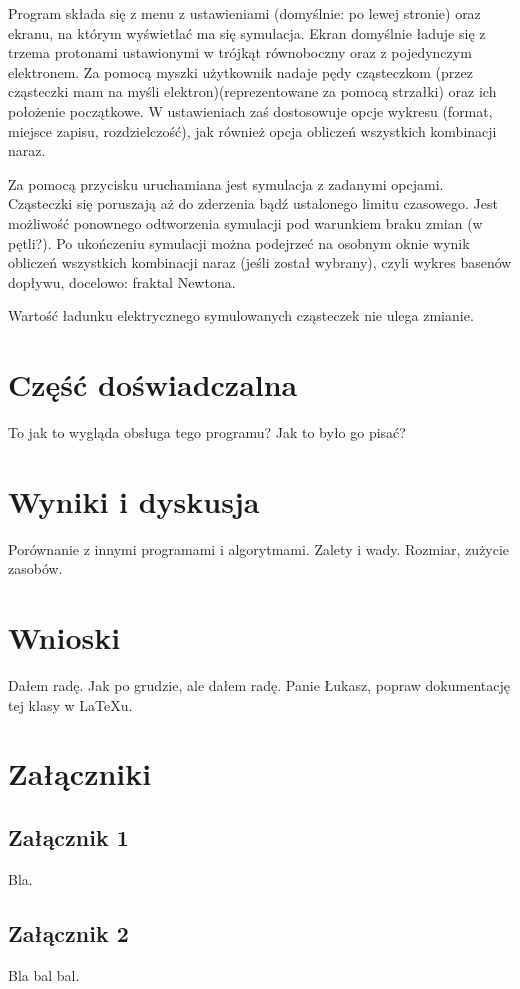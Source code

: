 \documentclass{SGGW-thesis}
\begin{document}
Program składa się z menu z ustawieniami (domyślnie: po lewej stronie) oraz ekranu, na którym wyświetlać ma się symulacja. Ekran domyślnie ładuje się z trzema protonami ustawionymi w trójkąt równoboczny oraz z pojedynczym elektronem. Za pomocą myszki użytkownik nadaje pędy cząsteczkom (przez cząsteczki mam na myśli elektron)(reprezentowane za pomocą strzałki) oraz ich położenie początkowe. W ustawieniach zaś dostosowuje opcje wykresu (format, miejsce zapisu, rozdzielczość), jak również opcja obliczeń wszystkich kombinacji naraz. 

Za pomocą przycisku uruchamiana jest symulacja z zadanymi opcjami. Cząsteczki się poruszają aż do zderzenia bądź ustalonego limitu czasowego. Jest możliwość ponownego odtworzenia symulacji pod warunkiem braku zmian (w pętli?). Po ukończeniu symulacji można podejrzeć na osobnym oknie wynik obliczeń wszystkich kombinacji naraz (jeśli został wybrany), czyli wykres basenów dopływu, docelowo: fraktal Newtona.

Wartość ładunku elektrycznego symulowanych cząsteczek nie ulega zmianie.

\chapter{Część doświadczalna}
To jak to wygląda obsługa tego programu? Jak to było go pisać?

\chapter{Wyniki i dyskusja}
Porównanie z innymi programami i algorytmami. Zalety i wady. Rozmiar, zużycie zasobów.

\chapter{Wnioski}
Dałem radę. Jak po grudzie, ale dałem radę.
Panie Łukasz, popraw dokumentację tej klasy w LaTeXu.

\chapter{Załączniki}
\section{Załącznik 1}
Bla.

\section{Załącznik 2}
Bla bal bal.



\beforelastpage[2025]
\end{document}

